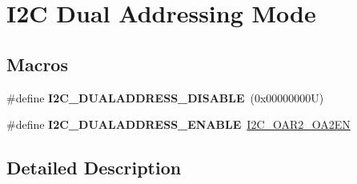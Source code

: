 \hypertarget{group___i2_c___d_u_a_l___a_d_d_r_e_s_s_i_n_g___m_o_d_e}{}\section{I2C Dual Addressing Mode}
\label{group___i2_c___d_u_a_l___a_d_d_r_e_s_s_i_n_g___m_o_d_e}
\subsection*{Macros}
\begin{DoxyCompactItemize}
\item 
\mbox{\label{group___i2_c___d_u_a_l___a_d_d_r_e_s_s_i_n_g___m_o_d_e_gacb8f4a1fd543e5ef2c9e7711fc9b5a67}} 
\#define {\bfseries I2\+C\+\_\+\+D\+U\+A\+L\+A\+D\+D\+R\+E\+S\+S\+\_\+\+D\+I\+S\+A\+B\+LE}~(0x00000000\+U)
\item 
\mbox{\label{group___i2_c___d_u_a_l___a_d_d_r_e_s_s_i_n_g___m_o_d_e_gae33ff5305d9f38d857cff1774f481fab}} 
\#define {\bfseries I2\+C\+\_\+\+D\+U\+A\+L\+A\+D\+D\+R\+E\+S\+S\+\_\+\+E\+N\+A\+B\+LE}~\mbox{\hyperlink{group___peripheral___registers___bits___definition_gaa6ec62ffdf8a682e5e0983add8fdfa26}{I2\+C\+\_\+\+O\+A\+R2\+\_\+\+O\+A2\+EN}}
\end{DoxyCompactItemize}


\subsection{Detailed Description}
